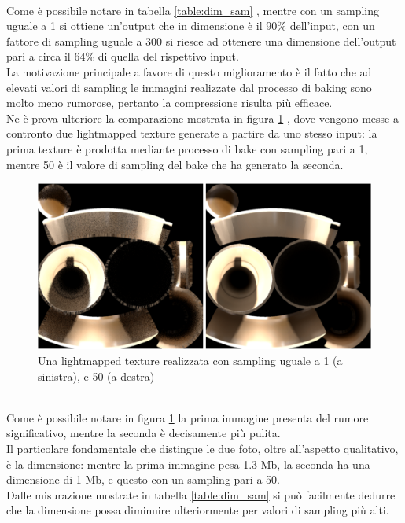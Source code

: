 \\
Come è possibile notare in tabella \ref{table:dim_sam} , mentre con un sampling uguale a 1 si ottiene un’output che in dimensione è il 90\% dell’input, con un fattore di sampling uguale a 300 si riesce ad ottenere una dimensione dell’output pari a circa il 64\% di quella del rispettivo input. 
\\
La motivazione principale a favore di questo miglioramento è il fatto che ad elevati valori di sampling le immagini realizzate dal processo di baking sono molto meno rumorose, pertanto la compressione risulta più efficace. 
\\
Ne è prova ulteriore la comparazione mostrata in figura \ref{fig:dim_sam} , dove vengono messe a contronto due lightmapped texture generate a partire da uno stesso input: la prima texture è prodotta mediante processo di bake con sampling pari a 1, mentre 50 è il valore di sampling del bake che ha generato la seconda.
\\
\begin{figure}[htb]
 \centering
 \includegraphics[width=1\linewidth]{images/chapter_prove_sperimentali/dim_sam.png}\hfill
 \caption[Confronto dimensione lightmapped texture]{Una lightmapped texture realizzata con sampling uguale a 1 (a sinistra), e 50 (a destra)}
 \label{fig:dim_sam}
\end{figure}
\\
Come è possibile notare in figura \ref{fig:dim_sam} la prima immagine presenta del rumore significativo, mentre la seconda è decisamente più pulita.
\\ 
Il particolare fondamentale che distingue le due foto, oltre all’aspetto qualitativo, è la dimensione: mentre la prima immagine pesa 1.3 Mb, la seconda ha una dimensione di 1 Mb, e questo con un sampling pari a 50. 
\\
Dalle misurazione mostrate in tabella \ref{table:dim_sam} si può facilmente dedurre che la dimensione possa diminuire ulteriormente per valori di sampling più alti.